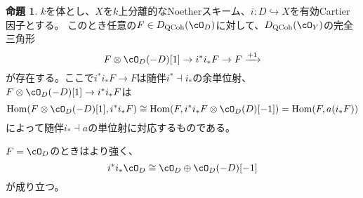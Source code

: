 \documentclass[uplatex, a4paper, dvipdfmx]{jsarticle}
\theoremstyle{definition}
\newtheorem{proposition}[theorem]{命題}
\DeclareMathOperator{\Hom}{\mathrm{Hom}}
\DeclareMathOperator{\QCoh}{\mathrm{QCoh}}
\begin{document}
\begin{proposition}\label{prop:triangle-for-push-pull}
    $k$を体とし、$X$を$k$上分離的なNoetherスキーム、$i \colon D \hookrightarrow X$を有効Cartier因子とする。
    このとき任意の$F \in D_{\QCoh}(\cO_D)$に対して、$D_{\QCoh}(\cO_Y)$の完全三角形
    \begin{equation}
        F \otimes \cO_D(-D)[1] \to i^*i_*F \to F \xrightarrow{+1}
    \end{equation}
    が存在する。ここで$i^*i_*F \to F$は随伴$i^* \dashv i_*$の余単位射、$F \otimes \cO_D(-D)[1] \to i^*i_*F$は
    \begin{equation}
        \Hom(F \otimes \cO_D(-D)[1], i^*i_*F) \cong \Hom(F, i^*i_*F\otimes \cO_D(D)[-1]) = \Hom(F, a(i_*F))
    \end{equation}
    によって随伴$i_* \dashv a$の単位射に対応するものである。

    $F = \cO_D$のときはより強く、
    \begin{equation}
        i^*i_*\cO_D \cong \cO_D \oplus \cO_D(-D)[-1]
    \end{equation}
    が成り立つ。
\end{proposition}
\end{document}
